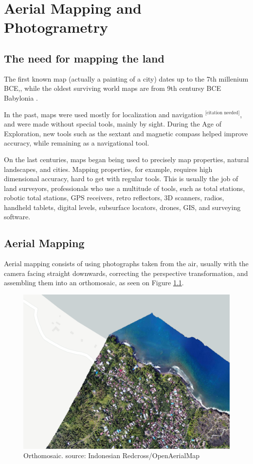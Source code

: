 

\chapter{Aerial Mapping and Photogrametry} \label{chap:AerialMapping}



\section{The need for mapping the land}
The first known map (actually a painting of a city) dates up to the 7th millenium BCE,\cite{map1}, while the oldest surviving world maps are from 9th centursy BCE Babylonia\cite{map2}	.

In the past, maps were used mostly for localization and navigation $^{\text{[citation needed]}}$, and were made without special tools, mainly by sight. During the Age of Exploration, new tools such as the sextant and magnetic compass helped improve accuracy, while remaining as a navigational tool.

On the last centuries, maps began being used to precisely map properties, natural landscapes, and cities. Mapping properties, for example, requires high dimensional accuracy, hard to get with regular tools. This is usually the job of land surveyors, professionals who use a multitude of tools, such as total stations, robotic total stations, GPS receivers, retro reflectors, 3D scanners, radios, handheld tablets, digital levels, subsurface locators, drones, GIS, and surveying software.


\section{Aerial Mapping}
Aerial mapping consists of using photographs taken from the air, usually with the camera facing straight downwards, correcting the perspective transformation, and assembling them into an orthomosaic, as seen on Figure \ref{fig:orthomosaic}.

\begin{figure}
\centering
  \includegraphics[width=\linewidth]{figs/orthomosaic.png}
  \caption{Orthomosaic. source: Indonesian Redcross/OpenAerialMap}
  \label{fig:orthomosaic}
\end{figure}


